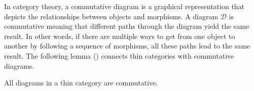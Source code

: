 

In category theory, a commutative diagram is a graphical representation that depicts the relationships between objects and morphisms.  A diagram $\mathcal{D}$ is commutative meaning that different paths through the diagram yield the same result. In other words, if there are multiple ways to get from one object to another by following a sequence of morphisms, all these paths lead to the same result. The following lemma (\cite{roman2017introduction}) connects thin categories with commutative diagrams.



 

 

 \begin{lemma}   All diagrams in a thin category are commutative.\label{lem:thincommutative} 
 \end{lemma}




